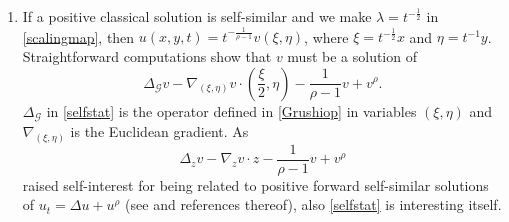 \documentclass[12pt]{amsart}
\begin{document}
\begin{enumerate}
	\item[(d)] If a positive classical solution is self-similar and we make $\lambda = t^{-\frac{1}{2}}$ in \eqref{scalingmap}, then $u(x,y,t) = t^{-\frac{1}{\rho-1}} v(\xi, \eta)$, where $\xi = t^{-\frac{1}{2}} x$ and $\eta = t^{-1}y$. Straightforward computations show that $v$ must be a solution of
	\begin{equation}\label{selfstat}
		\Delta_{\mathcal{G}}v - \nabla_{(\xi,\eta)} v \cdot \left(\frac{\xi}{2},\eta\right) - \frac{1}{\rho-1} v + v^\rho .
	\end{equation}
	$\Delta_{\mathcal{G}}$ in \eqref{selfstat} is the operator defined in \eqref{Grushiop} in variables $(\xi,\eta)$ and $\nabla_{(\xi,\eta)}$ is the Euclidean gradient. As
	\begin{equation*}
		\Delta_z v - \nabla_z v \cdot z - \frac{1}{\rho-1} v + v^\rho 
	\end{equation*}
	raised self-interest for being related to positive forward self-similar solutions of $u_t = \Delta u + u^\rho$ (see \cite{Giga86} and references thereof), also \eqref{selfstat} is interesting itself.
	

\end{enumerate}
\end{document}
